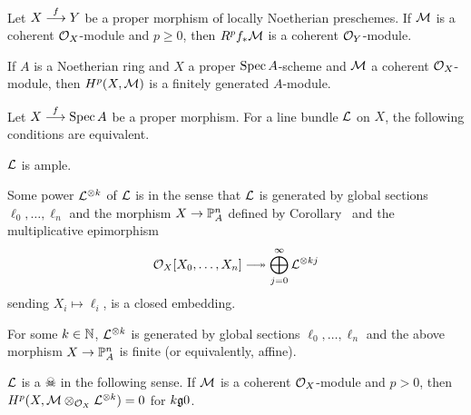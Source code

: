 \documentclass[a4paper,parskip=half,numbers=enddot, DIV=12]{scrreprt}
\begin{document}
\begin{thm}
	Let $X\morphism[f]Y$ be a proper morphism of locally Noetherian preschemes. If $\mathcal{M}$ is a coherent $\mathcal{O}_X$-module and $p\geq 0$, then $R^pf_*\mathcal{M}$ is a coherent $\mathcal{O}_Y$-module.
\end{thm}
\begin{cor}
	If $A$ is a Noetherian ring and $X$ a proper $\operatorname{Spec} A$-scheme and $\mathcal{M}$ a coherent $\mathcal{O}_X$-module, then $H^p(X,\mathcal{M})$ is a finitely generated $A$-module.
\end{cor}
\begin{thm}
	Let $X\morphism[f]\Spec A$ be a proper morphism. For a line bundle $\mathcal{L}$ on $X$, the following conditions are equivalent.
	\begin{alphanumerate}
		\item $\mathcal{L}$ is ample.
		\item Some power $\mathcal{L}^{\otimes k}$ of $\mathcal{L}$ is  in the sense that $\mathcal{L}$ is generated by global sections $\ell_0,\ldots,\ell_n$ and the morphism $X\morphism\IP_A^n$ defined by Corollary~ and the multiplicative epimorphism 
		\begin{align*}
			\Oo_X[X_0,\ldots,X_n]\epimorphism\bigoplus_{j=0}^\infty\Ll^{\otimes kj}
		\end{align*}
		sending $X_i\mapsto \ell_i$, is a closed embedding.
		\item For some $k\in\mathbb{N}$, $\mathcal{L}^{\otimes k}$ is generated by global sections $\ell_0,\ldots,\ell_n$ and the above morphism $X\morphism\IP_A^n$ is finite (or equivalently, affine).
		\item $\mathcal{L}$ is a $\skull$ in the following sense. If $\mathcal{M}$ is a coherent $\mathcal{O}_X$-module and $p>0$, then $H^p(X,\mathcal{M}\otimes_{\mathcal{O}_X}\mathcal{L}^{\otimes k})=0$ for $k\gge 0$.
	\end{alphanumerate}
\end{thm}
\end{document}
